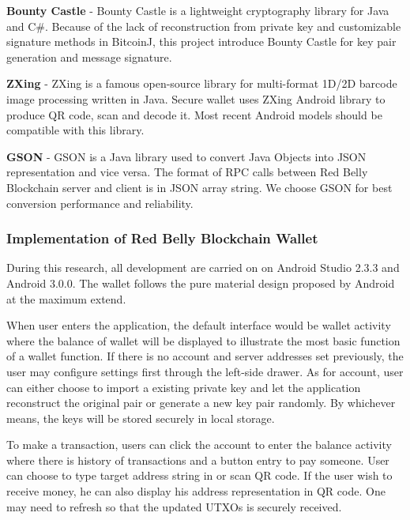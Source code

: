 \documentclass[12pt]{article}
\begin{document}
\textbf{Bounty Castle} - Bounty Castle is a lightweight cryptography library for Java and C#. Because of the lack of reconstruction from private key and customizable signature methods in BitcoinJ, this project introduce Bounty Castle for key pair generation and message signature. 

\textbf{ZXing} - ZXing is a famous open-source library for multi-format 1D/2D barcode image processing written in Java. Secure wallet uses ZXing Android library to produce QR code, scan and decode it. Most recent Android models should be compatible with this library.

\textbf{GSON} - GSON is a Java library used to convert Java Objects into JSON representation and vice versa. The format of RPC calls between Red Belly Blockchain server and client is in JSON array string. We choose GSON for best conversion performance and reliability.

\subsubsection{Implementation of Red Belly Blockchain Wallet}

During this research, all development are carried on on Android Studio 2.3.3 and Android 3.0.0. The wallet follows the pure material design proposed by Android at the maximum extend.

When user enters the application, the default interface would be wallet activity where the balance of wallet will be displayed to illustrate the most basic function of a wallet function. If there is no account and server addresses set previously, the user may configure settings first through the left-side drawer. As for account, user can either choose to import a existing private key and let the application reconstruct the original pair or generate a new key pair randomly. By whichever means, the keys will be stored securely in local storage.

To make a transaction, users can click the account to enter the balance activity where there is history of transactions and a button entry to pay someone. User can choose to type target address string in or scan QR code. If the user wish to receive money, he can also display his address representation in QR code. One may need to refresh so that the updated UTXOs is securely received.
\end{document}

